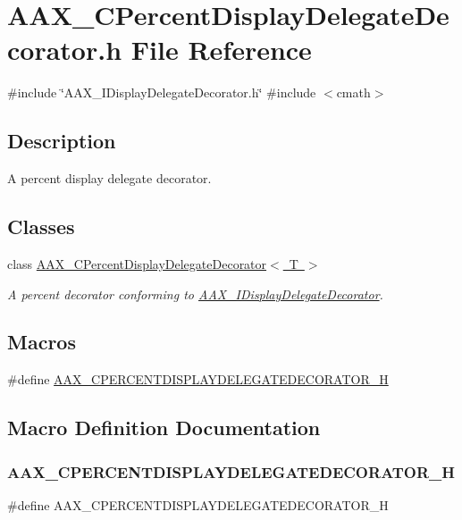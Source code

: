 \hypertarget{a00461}{}\section{A\+A\+X\+\_\+\+C\+Percent\+Display\+Delegate\+Decorator.\+h File Reference}
\label{a00461}
{\ttfamily \#include \char`\"{}A\+A\+X\+\_\+\+I\+Display\+Delegate\+Decorator.\+h\char`\"{}}\newline
{\ttfamily \#include $<$cmath$>$}\newline


\subsection{Description}
A percent display delegate decorator. 

\subsection*{Classes}
\begin{DoxyCompactItemize}
\item 
class \mbox{\hyperlink{a01549}{A\+A\+X\+\_\+\+C\+Percent\+Display\+Delegate\+Decorator$<$ T $>$}}
\begin{DoxyCompactList}\small\item\em A percent decorator conforming to \mbox{\hyperlink{a01805}{A\+A\+X\+\_\+\+I\+Display\+Delegate\+Decorator}}. \end{DoxyCompactList}\end{DoxyCompactItemize}
\subsection*{Macros}
\begin{DoxyCompactItemize}
\item 
\#define \mbox{\hyperlink{a00461_a444efad81dddfb9885476fe11d239387}{A\+A\+X\+\_\+\+C\+P\+E\+R\+C\+E\+N\+T\+D\+I\+S\+P\+L\+A\+Y\+D\+E\+L\+E\+G\+A\+T\+E\+D\+E\+C\+O\+R\+A\+T\+O\+R\+\_\+H}}
\end{DoxyCompactItemize}


\subsection{Macro Definition Documentation}
\mbox{\label{a00461_a444efad81dddfb9885476fe11d239387}} 
\subsubsection{\texorpdfstring{AAX\_CPERCENTDISPLAYDELEGATEDECORATOR\_H}{AAX\_CPERCENTDISPLAYDELEGATEDECORATOR\_H}}
{\footnotesize\ttfamily \#define A\+A\+X\+\_\+\+C\+P\+E\+R\+C\+E\+N\+T\+D\+I\+S\+P\+L\+A\+Y\+D\+E\+L\+E\+G\+A\+T\+E\+D\+E\+C\+O\+R\+A\+T\+O\+R\+\_\+H}

